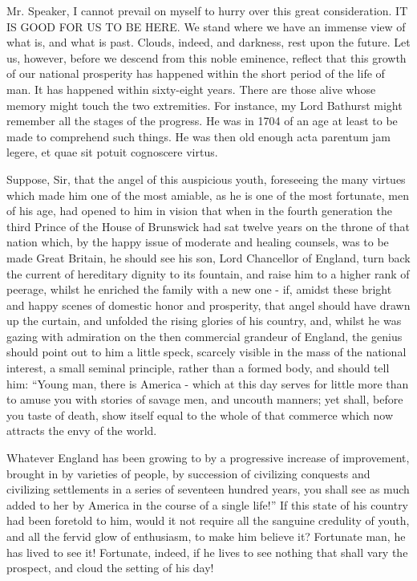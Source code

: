 Mr. Speaker, I cannot prevail on myself to hurry over this great consideration. IT IS GOOD FOR US TO BE HERE. We stand where we have an immense view of what is, and what is past. Clouds, indeed, and darkness, rest upon the future. Let us, however, before we descend from this noble eminence, reflect that this growth of our national prosperity has happened within the short period of the life of man. It has happened within sixty-eight years. There are those alive whose memory might touch the two extremities. For instance, my Lord Bathurst might remember all the stages of the progress. He was in 1704 of an age at least to be made to comprehend such things. He was then old enough acta parentum jam legere, et quae sit potuit cognoscere virtus.\par

Suppose, Sir, that the angel of this auspicious youth, foreseeing the many virtues which made him one of the most amiable, as he is one of the most fortunate, men of his age, had opened to him in vision that when in the fourth generation the third Prince of the House of Brunswick had sat twelve years on the throne of that nation which, by the happy issue of moderate and healing counsels, was to be made Great Britain, he should see his son, Lord Chancellor of England, turn back the current of hereditary dignity to its fountain, and raise him to a higher rank of peerage, whilst he enriched the family with a new one - if, amidst these bright and happy scenes of domestic honor and prosperity, that angel should have drawn up the curtain, and unfolded the rising glories of his country, and, whilst he was gazing with admiration on the then commercial grandeur of England, the genius should point out to him a little speck, scarcely visible in the mass of the national interest, a small seminal principle, rather than a formed body, and should tell him: “Young man, there is America - which at this day serves for little more than to amuse you with stories of savage men, and uncouth manners; yet shall, before you taste of death, show itself equal to the whole of that commerce which now attracts the envy of the world.\par

Whatever England has been growing to by a progressive increase of improvement, brought in by varieties of people, by succession of civilizing conquests and civilizing settlements in a series of seventeen hundred years, you shall see as much added to her by America in the course of a single life!” If this state of his country had been foretold to him, would it not require all the sanguine credulity of youth, and all the fervid glow of enthusiasm, to make him believe it? Fortunate man, he has lived to see it! Fortunate, indeed, if he lives to see nothing that shall vary the prospect, and cloud the setting of his day!\par

